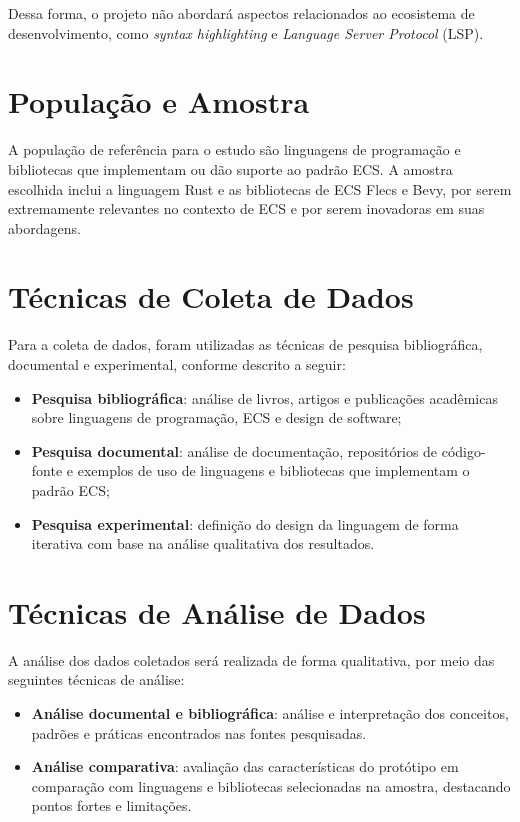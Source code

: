 Dessa forma, o projeto não abordará aspectos relacionados ao ecosistema de desenvolvimento, como \textit{syntax highlighting} e \textit{Language Server Protocol} (LSP).

\section{População e Amostra}

A população de referência para o estudo são linguagens de programação e bibliotecas que implementam ou dão suporte ao padrão ECS. A amostra escolhida inclui a linguagem Rust e as bibliotecas de ECS Flecs e Bevy, por serem extremamente relevantes no contexto de ECS e por serem inovadoras em suas abordagens.

\section{Técnicas de Coleta de Dados}

Para a coleta de dados, foram utilizadas as técnicas de pesquisa bibliográfica, documental e experimental, conforme descrito a seguir:

\begin{itemize}
    \item \textbf{Pesquisa bibliográfica}: análise de livros, artigos e publicações acadêmicas sobre linguagens de programação, ECS e design de software;
    \item \textbf{Pesquisa documental}: análise de documentação, repositórios de código-fonte e exemplos de uso de linguagens e bibliotecas que implementam o padrão ECS;
    \item \textbf{Pesquisa experimental}: definição do design da linguagem de forma iterativa com base na análise qualitativa dos resultados.
\end{itemize}

\section{Técnicas de Análise de Dados}

A análise dos dados coletados será realizada de forma qualitativa, por meio das seguintes técnicas de análise:

\begin{itemize}
    \item \textbf{Análise documental e bibliográfica}: análise e interpretação dos conceitos, padrões e práticas encontrados nas fontes pesquisadas.
    \item \textbf{Análise comparativa}: avaliação das características do protótipo em comparação com linguagens e bibliotecas selecionadas na amostra, destacando pontos fortes e limitações.
\end{itemize}

